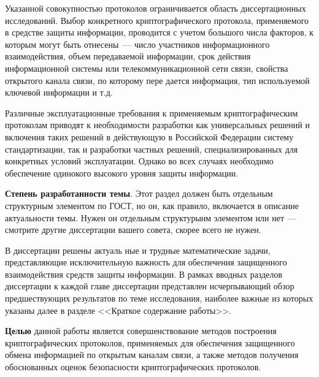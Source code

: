 \documentclass[12pt]{extreport}
\begin{document}
Указанной совокупностью протоколов ограничивается область диссертационных исследований.
Выбор конкретного криптографического протокола, применяемого в средстве защиты информации, проводится с учетом большого числа факторов, к которым могут быть отнесены~--- число участников информационного взаимодействия, объем передаваемой информации, срок действия информационной системы или телекоммуникационной сети связи, свойства открытого канала связи, по которому пере дается информация, тип используемой ключевой информации и т.д.

Различные эксплуатационные требования к применяемым криптографическим протоколам приводят к необходимости разработки как универсальных решений и включения таких решений в действующую в Российской Федерации систему стандартизации, так и разработки частных решений, специализированных для конкретных условий эксплуатации.
Однако во всех случаях необходимо обеспечение одинокого высокого уровня защиты информации.

\textbf{Степень разработанности темы}.
Этот раздел должен быть отдельным структурным элементом по ГОСТ, но он, как правило, включается в описание актуальности темы.
Нужен он отдельным структурынм элементом или нет --- смотрите другие диссертации вашего совета, скорее всего не нужен.

В диссертации решены актуаль ные и трудные математические задачи, представляющие исключительную важность для обеспечения защищенного взаимодействия средств защиты информации.
В рамках вводных разделов диссертации к каждой главе диссертации представлен исчерпывающий обзор предшествующих результатов по теме исследования, наиболее важные из которых указаны далее в разделе {}<<Краткое содержание работы>>{}.

\textbf{Целью} данной работы является совершенствование методов построения криптографических протоколов, применяемых для обеспечения защищенного обмена информацией по открытым каналам связи, а также методов получения обоснованных оценок безопасности криптографических протоколов.
\end{document}
